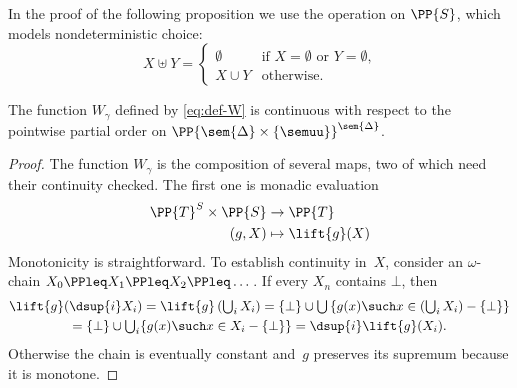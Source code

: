 In the proof of the following proposition we use the  operation on $\PP{S}$, which models nondeterministic choice:
\[
X \uplus Y = \begin{cases}
\emptyset & \text{if $X = \emptyset$ or $Y = \emptyset$,} \\
X \cup Y & \text{otherwise.}
\end{cases}
\]

\begin{proposition} 
\label{prop:continuity}
The function $W_\gamma$ defined by \eqref{eq:def-W} is continuous with respect to the
pointwise partial order on $\PP{\sem{\Delta} \times \{\semuu\}}^{\sem{\Delta}}$.
\end{proposition}
%

\begin{proof}
%
The function $W_\gamma$ is the composition of several maps, two of which need their continuity checked.
%
The first one is monadic evaluation
%
\begin{align*}
   \PP{T}^S \times \PP{S} &\to \PP{T}  \\
  (g, X) &\mapsto \lift{g}(X)
\end{align*}
%
Monotonicity is straightforward.
%
To establish continuity in~$X$, consider an $\omega$-chain $X_0 \PPleq X_1 \PPleq X_2 \PPleq \dots$.
If every $X_n$ contains $\bot$, then 
\begin{multline*}
\textstyle
\lift{g}(\dsup{i}X_i) =
\lift{g}\left(\bigcup_{i}X_i\right) =
\{\bot\} \cup \bigcup \left\{g(x) \such x \in \left(\bigcup_i X_i\right) - \{\bot\}\right\}
\\
\textstyle
= \{\bot\} \cup \bigcup_i \{g(x) \such x \in X_i - \{\bot\}\}
= \dsup{i}  \lift{g}(X_i).
\end{multline*}
%
Otherwise the chain is eventually constant and~$g$ preserves its supremum because it is monotone.


\end{proof}
